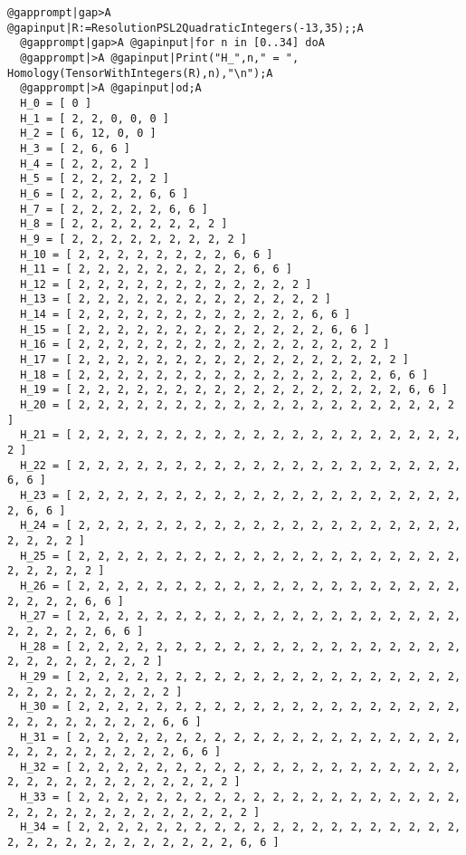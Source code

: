 \documentclass[a4paper,11pt]{report}
\begin{document}
{{\begin{Verbatim}[commandchars=@|A,fontsize=\small,frame=single,label=Example]
  @gapprompt|gap>A @gapinput|R:=ResolutionPSL2QuadraticIntegers(-13,35);;A
  @gapprompt|gap>A @gapinput|for n in [0..34] doA
  @gapprompt|>A @gapinput|Print("H_",n," = ", Homology(TensorWithIntegers(R),n),"\n");A
  @gapprompt|>A @gapinput|od;A
  H_0 = [ 0 ]
  H_1 = [ 2, 2, 0, 0, 0 ]
  H_2 = [ 6, 12, 0, 0 ]
  H_3 = [ 2, 6, 6 ]
  H_4 = [ 2, 2, 2, 2 ]
  H_5 = [ 2, 2, 2, 2, 2 ]
  H_6 = [ 2, 2, 2, 2, 6, 6 ]
  H_7 = [ 2, 2, 2, 2, 2, 6, 6 ]
  H_8 = [ 2, 2, 2, 2, 2, 2, 2, 2 ]
  H_9 = [ 2, 2, 2, 2, 2, 2, 2, 2, 2 ]
  H_10 = [ 2, 2, 2, 2, 2, 2, 2, 2, 6, 6 ]
  H_11 = [ 2, 2, 2, 2, 2, 2, 2, 2, 2, 6, 6 ]
  H_12 = [ 2, 2, 2, 2, 2, 2, 2, 2, 2, 2, 2, 2 ]
  H_13 = [ 2, 2, 2, 2, 2, 2, 2, 2, 2, 2, 2, 2, 2 ]
  H_14 = [ 2, 2, 2, 2, 2, 2, 2, 2, 2, 2, 2, 2, 6, 6 ]
  H_15 = [ 2, 2, 2, 2, 2, 2, 2, 2, 2, 2, 2, 2, 2, 6, 6 ]
  H_16 = [ 2, 2, 2, 2, 2, 2, 2, 2, 2, 2, 2, 2, 2, 2, 2, 2 ]
  H_17 = [ 2, 2, 2, 2, 2, 2, 2, 2, 2, 2, 2, 2, 2, 2, 2, 2, 2 ]
  H_18 = [ 2, 2, 2, 2, 2, 2, 2, 2, 2, 2, 2, 2, 2, 2, 2, 2, 6, 6 ]
  H_19 = [ 2, 2, 2, 2, 2, 2, 2, 2, 2, 2, 2, 2, 2, 2, 2, 2, 2, 6, 6 ]
  H_20 = [ 2, 2, 2, 2, 2, 2, 2, 2, 2, 2, 2, 2, 2, 2, 2, 2, 2, 2, 2, 2 ]
  H_21 = [ 2, 2, 2, 2, 2, 2, 2, 2, 2, 2, 2, 2, 2, 2, 2, 2, 2, 2, 2, 2, 2 ]
  H_22 = [ 2, 2, 2, 2, 2, 2, 2, 2, 2, 2, 2, 2, 2, 2, 2, 2, 2, 2, 2, 2, 6, 6 ]
  H_23 = [ 2, 2, 2, 2, 2, 2, 2, 2, 2, 2, 2, 2, 2, 2, 2, 2, 2, 2, 2, 2, 2, 6, 6 ]
  H_24 = [ 2, 2, 2, 2, 2, 2, 2, 2, 2, 2, 2, 2, 2, 2, 2, 2, 2, 2, 2, 2, 2, 2, 2, 2 ]
  H_25 = [ 2, 2, 2, 2, 2, 2, 2, 2, 2, 2, 2, 2, 2, 2, 2, 2, 2, 2, 2, 2, 2, 2, 2, 2, 2 ]
  H_26 = [ 2, 2, 2, 2, 2, 2, 2, 2, 2, 2, 2, 2, 2, 2, 2, 2, 2, 2, 2, 2, 2, 2, 2, 2, 6, 6 ]
  H_27 = [ 2, 2, 2, 2, 2, 2, 2, 2, 2, 2, 2, 2, 2, 2, 2, 2, 2, 2, 2, 2, 2, 2, 2, 2, 2, 6, 6 ]
  H_28 = [ 2, 2, 2, 2, 2, 2, 2, 2, 2, 2, 2, 2, 2, 2, 2, 2, 2, 2, 2, 2, 2, 2, 2, 2, 2, 2, 2, 2 ]
  H_29 = [ 2, 2, 2, 2, 2, 2, 2, 2, 2, 2, 2, 2, 2, 2, 2, 2, 2, 2, 2, 2, 2, 2, 2, 2, 2, 2, 2, 2, 2 ]
  H_30 = [ 2, 2, 2, 2, 2, 2, 2, 2, 2, 2, 2, 2, 2, 2, 2, 2, 2, 2, 2, 2, 2, 2, 2, 2, 2, 2, 2, 2, 6, 6 ]
  H_31 = [ 2, 2, 2, 2, 2, 2, 2, 2, 2, 2, 2, 2, 2, 2, 2, 2, 2, 2, 2, 2, 2, 2, 2, 2, 2, 2, 2, 2, 2, 6, 6 ]
  H_32 = [ 2, 2, 2, 2, 2, 2, 2, 2, 2, 2, 2, 2, 2, 2, 2, 2, 2, 2, 2, 2, 2, 2, 2, 2, 2, 2, 2, 2, 2, 2, 2, 2 ]
  H_33 = [ 2, 2, 2, 2, 2, 2, 2, 2, 2, 2, 2, 2, 2, 2, 2, 2, 2, 2, 2, 2, 2, 2, 2, 2, 2, 2, 2, 2, 2, 2, 2, 2, 2 ]
  H_34 = [ 2, 2, 2, 2, 2, 2, 2, 2, 2, 2, 2, 2, 2, 2, 2, 2, 2, 2, 2, 2, 2, 2, 2, 2, 2, 2, 2, 2, 2, 2, 2, 2, 6, 6 ]
  

\end{Verbatim}}}
\end{document}
